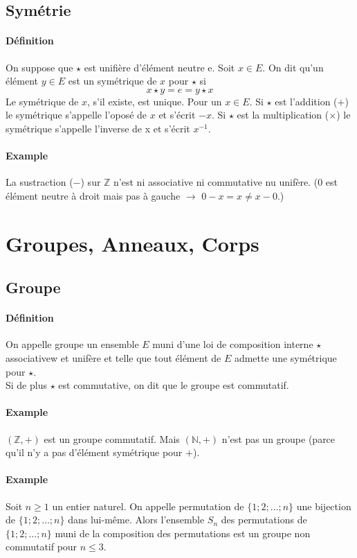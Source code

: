 %
\subsection{Symétrie}
%
\paragraph{Définition} On suppose que $\star$ est unifière d'élément neutre e. Soit $x \in E$. On dit qu'un élément $y \in E$ est un symétrique de $x$ pour $\star$ si
$$ x \star y = e = y \star x$$
Le symétrique de $x$, s'il existe, est unique. Pour un $x \in E$. Si $\star$ est l'addition ($+$) le symétrique s'appelle l'oposé de $x$ et s'écrit $-x$. Si $\star$ est la multiplication ($\times$) le symétrique s'appelle l'inverse de x et s'écrit $x^{-1}$.
 
\paragraph{Example} La sustraction ($-$) sur $\mathbb{Z}$ n'est ni associative ni commutative nu unifère. ($0$ est élément neutre à droit mais pas à gauche $\rightarrow$ $0 - x = x \neq x - 0$.)

%
%
\section{Groupes, Anneaux, Corps}
%
%
%
\subsection{Groupe}
%
\paragraph{Définition} On appelle groupe un ensemble $E$ muni d'une loi de composition interne $\star$ associativew et unifère et telle que tout élément de $E$ admette une symétrique pour $\star$. \\
Si de plus $\star$ est commutative, on dit que le groupe est commutatif.

\paragraph{Example}
$(\mathbb{Z}, +)$ est un groupe commutatif. Mais $(\mathbb{N}, +)$ n'est pas un groupe (parce qu'il n'y a pas d'élément symétrique pour $+$).

\paragraph{Example} Soit $n \geq 1$ un entier naturel. On appelle permutation de $\{ 1; 2; \ldots ; n\}$ une bijection de $\{ 1; 2; \ldots ; n\}$ dans lui-même. Alors l'ensemble $S_n$ des permutations de $\{ 1; 2; \ldots ; n\}$ muni de la composition des permutations est un groupe non commutatif pour $n \leq 3$.


